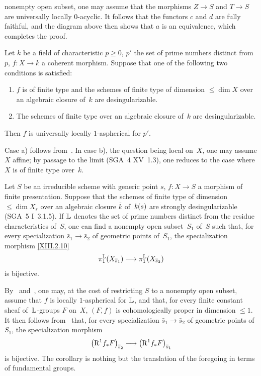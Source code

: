 nonempty open subset, one may assume that the morphisms $Z\to S$ and $T\to
S$ are universally locally $0$-acyclic. It follows
that the functors $c$ and $d$ are fully faithful, and the
diagram above then shows that $a$ is an equivalence, which
completes the proof.
\begin{corollary}
\label{XIII.3.4}
Let $k$ be a field of characteristic $p\geqslant0$, $p'$
the set of prime numbers distinct from~$p$, $f\colon X\to k$ a
coherent morphism. Suppose that one of the following two
conditions is satisfied:
\begin{enumerate}
\item[a)] $f$ is of finite type and the schemes of finite type of
dimension $\leqslant\dim X$ over an algebraic closure of~$k$
are desingularizable.
\item[b)] The schemes of finite type over an algebraic
closure of~$k$ are desingularizable.
\end{enumerate}
Then $f$ is universally locally $1$-aspherical for $p'$.
\end{corollary}

Case a) follows from~. In case b), the question
being local on~$X$, one may assume $X$ affine; by passage
to the limit (SGA~4 XV~1.3), one reduces to the case where $X$ is
of finite type over~$k$.
\begin{corollary}
\label{XIII.3.5}
Let
$S$ be an irreducible scheme with generic point
$s$, $f\colon X\to S$ a morphism of finite
presentation. Suppose that the schemes of finite type of dimension
$\leqslant\dim X_s$ over an algebraic closure $\overline{k}$
of~$\mathit{k}(s)$ are strongly desingularizable \textup{(SGA~5 I~3.1.5)}. If
$\mathbb{L}$ denotes the set of prime numbers distinct from the
residue characteristics of~$S$, one can find a nonempty open
subset~$S_1$ of~$S$ such that, for every specialization
$\bar{s}_1\to\bar{s}_2$ of geometric points of~$S_1$, the
specialization morphism \eqref{XIII.2.10}
$$
\pi_1^{\LL}(X_{\bar{s}_1})\to\pi_1^{\LL}(X_{\bar{s}_2})
$$
is bijective.
\end{corollary}

By~ and~, one may, at the cost of
restricting $S$ to a nonempty open subset, assume that $f$ is
locally $1$-aspherical for $\mathbb{L}$, and that, for every finite constant sheaf
of~$\mathbb{L}$-groups $F$ on~$X$, $(F,f)$ is
cohomologically proper in dimension $\leqslant 1$. It then follows
from~ that, for every specialization
$\bar{s}_1\to\bar{s}_2$ of geometric points of~$S_1$, the
specialization morphism
$$
\left(\R^1 f_* F\right)_{\bar{s}_2} \to \left(\R^1 f_*
F\right)_{\bar{s}_1}
$$
is bijective. The corollary is nothing but the translation of the
foregoing in terms of fundamental groups.
